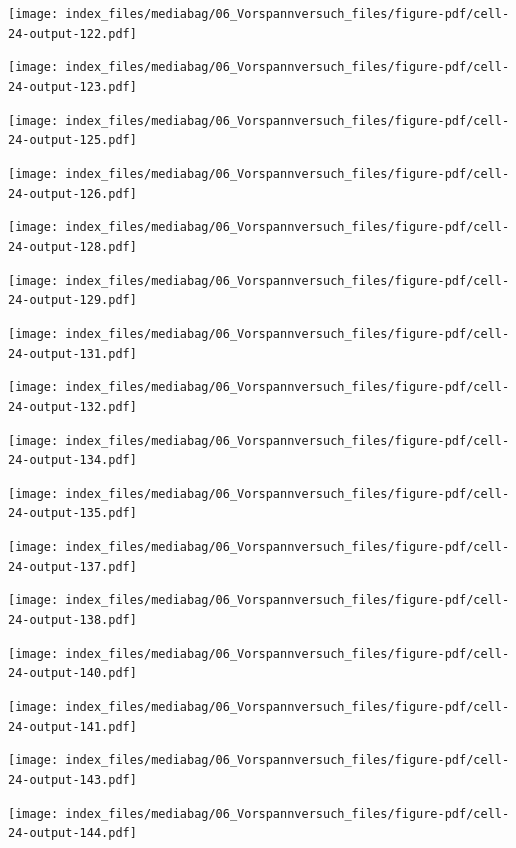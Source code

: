 \documentclass[
  11pt,
  letterpaper,
]{scrreprt}
\begin{document}
\newpage{}

\texttt{[image: index\_files/mediabag/06\_Vorspannversuch\_files/figure-pdf/cell-24-output-122.pdf]}

\texttt{[image: index\_files/mediabag/06\_Vorspannversuch\_files/figure-pdf/cell-24-output-123.pdf]}

\newpage{}

\texttt{[image: index\_files/mediabag/06\_Vorspannversuch\_files/figure-pdf/cell-24-output-125.pdf]}

\texttt{[image: index\_files/mediabag/06\_Vorspannversuch\_files/figure-pdf/cell-24-output-126.pdf]}

\newpage{}

\texttt{[image: index\_files/mediabag/06\_Vorspannversuch\_files/figure-pdf/cell-24-output-128.pdf]}

\texttt{[image: index\_files/mediabag/06\_Vorspannversuch\_files/figure-pdf/cell-24-output-129.pdf]}

\newpage{}

\texttt{[image: index\_files/mediabag/06\_Vorspannversuch\_files/figure-pdf/cell-24-output-131.pdf]}

\texttt{[image: index\_files/mediabag/06\_Vorspannversuch\_files/figure-pdf/cell-24-output-132.pdf]}

\newpage{}

\texttt{[image: index\_files/mediabag/06\_Vorspannversuch\_files/figure-pdf/cell-24-output-134.pdf]}

\texttt{[image: index\_files/mediabag/06\_Vorspannversuch\_files/figure-pdf/cell-24-output-135.pdf]}

\newpage{}

\texttt{[image: index\_files/mediabag/06\_Vorspannversuch\_files/figure-pdf/cell-24-output-137.pdf]}

\texttt{[image: index\_files/mediabag/06\_Vorspannversuch\_files/figure-pdf/cell-24-output-138.pdf]}

\newpage{}

\texttt{[image: index\_files/mediabag/06\_Vorspannversuch\_files/figure-pdf/cell-24-output-140.pdf]}

\texttt{[image: index\_files/mediabag/06\_Vorspannversuch\_files/figure-pdf/cell-24-output-141.pdf]}

\newpage{}

\texttt{[image: index\_files/mediabag/06\_Vorspannversuch\_files/figure-pdf/cell-24-output-143.pdf]}

\texttt{[image: index\_files/mediabag/06\_Vorspannversuch\_files/figure-pdf/cell-24-output-144.pdf]}
\end{document}
